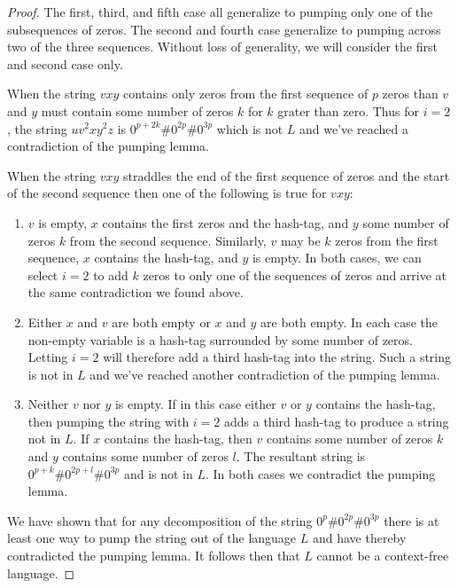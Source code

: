 \documentclass[10pt]{article}
\theoremstyle{definition}
\begin{document}
\begin{proof}
The first, third, and fifth case all generalize to pumping only one of the subsequences of zeros. The second and fourth case generalize to pumping across two of the three sequences. Without loss of generality, we will consider the first and second case only.

When the string $vxy$ contains only zeros from the first sequence of $p$ zeros than $v$ and $y$ must contain some number of zeros $k$ for $k$ grater than zero. Thus for $i=2$, the string $uv^{2}xy^{2}z$ is $0^{p+2k}\# 0^{2p}\# 0^{3p}$ which is not $L$ and we've reached a contradiction of the pumping lemma.

When the string $vxy$ straddles the end of the first sequence of zeros and the start of the second sequence then one of the following is true for $vxy$:
\begin{enumerate}[ label=\textbf{\roman*.} ]
  \item $v$ is empty, $x$ contains the first zeros and the hash-tag, and $y$ some number of zeros $k$ from the second sequence. Similarly, $v$ may be $k$ zeros from the first sequence, $x$ contains the hash-tag, and $y$ is empty. In both cases, we can select $i=2$ to add $k$ zeros to only one of the sequences of zeros and arrive at the same contradiction we found above.
  \item Either $x$ and $v$ are both empty or $x$ and $y$ are both empty. In each case the non-empty variable is a hash-tag surrounded by some number of zeros. Letting $i=2$ will therefore add a third hash-tag into the string. Such a string is not in $L$ and we've reached another contradiction of the pumping lemma.
  \item Neither $v$ nor $y$ is empty. If in this case either $v$ or $y$ contains the hash-tag, then pumping the string with $i=2$ adds a third hash-tag to produce a string not in $L$. If $x$ contains the hash-tag, then $v$ contains some number of zeros $k$ and $y$ contains some number of zeros $l$. The resultant string is $0^{p+k}\# 0^{2p+l} \# 0^{3p}$ and is not in $L$. In both cases we contradict the pumping lemma.
\end{enumerate}

We have shown that for any decomposition of the string $0^{p}\# 0^{2p} \# 0^{3p}$ there is at least one way to pump the string out of the language $L$ and have thereby contradicted the pumping lemma. It follows then that $L$ cannot be a context-free language.

\end{proof}
\end{document}
